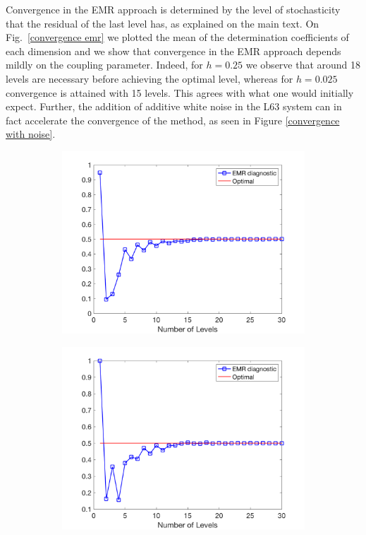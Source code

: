 \documentclass[12pt]{article}
\begin{document}
Convergence in the EMR approach is determined by the level of stochasticity that the residual of the last level has, as explained on the main text. On Fig.~\ref{convergence emr} we plotted the mean of the determination coefficients of each dimension and we show that convergence in the EMR approach depends mildly on the coupling parameter. Indeed, for $h=0.25$ we observe that around 18 levels are necessary before achieving the optimal level, whereas for $h=0.025$ convergence is attained with 15 levels. This agrees with what one would initially expect. Further, the addition of additive white noise in the L63 system can in fact accelerate the convergence of the method, as seen in Figure \ref{convergence with noise}.

\begin{figure}[H]
	\centering
	\begin{subfigure}[b]{0.49\textwidth}
		\centering
		\includegraphics[width=\textwidth]{plots/l84l63/emr_diagnostic_025.png}
	\end{subfigure}
	\hfill
	\begin{subfigure}[b]{0.49\textwidth}
		\centering
		\includegraphics[width=\textwidth]{plots/l84l63/emr_diagnostic_0025.png}

\end{subfigure}
\end{figure}
\end{document}
